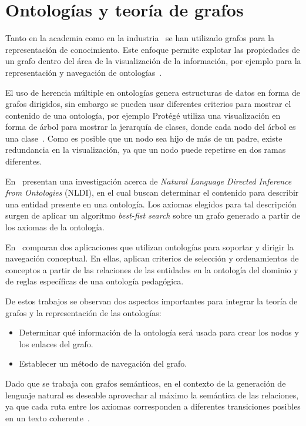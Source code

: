 \section{Ontologías y teoría de grafos}
Tanto en la academia como en la industria~\cite{soylu2018navigating} se han utilizado grafos para la representación de conocimiento. Este enfoque permite explotar las propiedades de un grafo dentro del área de la visualización de la información, por ejemplo para la representación y navegación de ontologías~\cite{escarza2005visualizacion}.

El uso de herencia múltiple en ontologías genera estructuras de datos en forma de grafos dirigidos, sin embargo se pueden usar diferentes criterios para mostrar el contenido de una ontología, por ejemplo Protégé utiliza una visualización en forma de árbol para mostrar la jerarquía de clases, donde cada nodo del árbol es una clase~\cite{protegehierarchy}. Como es posible que un nodo sea hijo de más de un padre, existe redundancia en la visualización, ya que un nodo puede repetirse en dos ramas diferentes.

En~\cite{mellish2008natural} presentan una investigación acerca de \emph{Natural Language Directed Inference from Ontologies} (NLDI), en el cual buscan determinar el contenido para describir una entidad presente en una ontología. Los axiomas elegidos para tal descripción surgen de aplicar un algoritmo \emph{best-fist search} sobre un grafo generado a partir de los axiomas de la ontología.

En~\cite{crampes2007ontology} comparan dos aplicaciones que utilizan ontologías para soportar y dirigir la navegación conceptual. En ellas, aplican criterios de selección y ordenamientos de conceptos a partir de las relaciones de las entidades en la ontología del dominio y de reglas específicas de una ontología pedagógica. 

De estos trabajos se observan dos aspectos importantes para integrar la teoría de grafos y la representación de las ontologías:
\begin{itemize}
    \item Determinar qué información de la ontología será usada para crear los nodos y los enlaces del grafo.
    \item Establecer un método de navegación del grafo.
\end{itemize}

Dado que se trabaja con grafos semánticos, en el contexto de la generación de lenguaje natural es deseable aprovechar al máximo la semántica de las relaciones, ya que cada ruta entre los axiomas corresponden a diferentes transiciones posibles en un texto coherente~\cite{mellish2008natural}.


